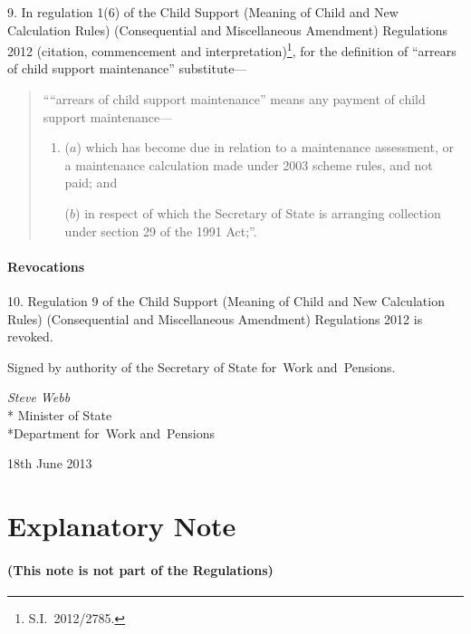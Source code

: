 \documentclass[12pt,a4paper]{article}
\begin{document}
9.  In regulation 1(6) of the Child Support (Meaning of Child and New Calculation Rules) (Consequential and Miscellaneous Amendment) Regulations 2012 (citation, commencement and interpretation)\footnote{S.I.~2012/2785.}, for the definition of “arrears of child support maintenance” substitute—
\begin{quotation}
““arrears of child support maintenance” means any payment of child support maintenance—
\begin{enumerate}\item[]
($a$) 
which has become due in relation to a maintenance assessment, or a maintenance calculation made under 2003 scheme rules, and not paid; and

($b$) 
in respect of which the Secretary of State is arranging collection under section 29 of the 1991 Act;”.
\end{enumerate}
\end{quotation}

\subsection[10. Revocations]{Revocations}

10.  Regulation 9 of the Child Support (Meaning of Child and New Calculation Rules) (Consequential and Miscellaneous Amendment) Regulations 2012 is revoked. 

\bigskip

\pagebreak[3]

Signed 
by authority of the 
Secretary of State for~Work and~Pensions.

{\raggedleft
\emph{Steve Webb}\\*
Minister
of State\\*Department 
for~Work and~Pensions

}

18th June 2013

\small

\part{Explanatory Note}

\renewcommand\parthead{— Explanatory Note}

\subsection*{(This note is not part of the Regulations)}
\end{document}
